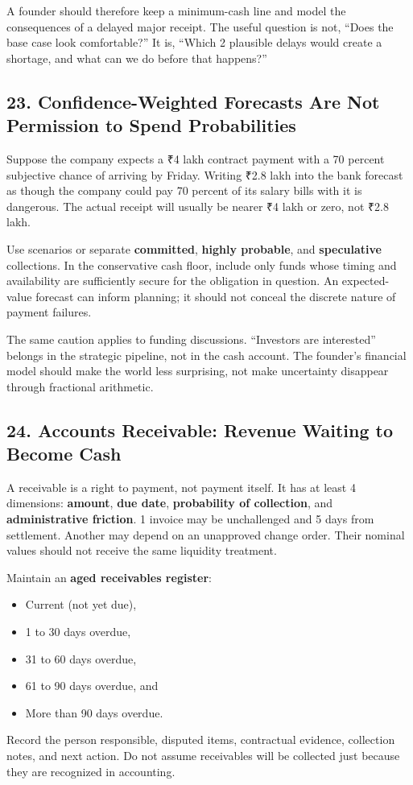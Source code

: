 A founder should therefore keep a minimum-cash line and model the consequences of a delayed major receipt. The useful question is not, ``Does the base case look comfortable?'' It is, ``Which 2 plausible delays would create a shortage, and what can we do before that happens?''

\subsection*{23. Confidence-Weighted Forecasts Are Not Permission to Spend Probabilities}

Suppose the company expects a ₹4 lakh contract payment with a 70 percent subjective chance of arriving by Friday. Writing ₹2.8 lakh into the bank forecast as though the company could pay 70 percent of its salary bills with it is dangerous. The actual receipt will usually be nearer ₹4 lakh or zero, not ₹2.8 lakh.

Use scenarios or separate \textbf{committed}, \textbf{highly probable}, and \textbf{speculative} collections. In the conservative cash floor, include only funds whose timing and availability are sufficiently secure for the obligation in question. An expected-value forecast can inform planning; it should not conceal the discrete nature of payment failures.

The same caution applies to funding discussions. ``Investors are interested'' belongs in the strategic pipeline, not in the cash account. The founder's financial model should make the world less surprising, not make uncertainty disappear through fractional arithmetic.

\subsection*{24. Accounts Receivable: Revenue Waiting to Become Cash}

A receivable is a right to payment, not payment itself. It has at least 4 dimensions: \textbf{amount}, \textbf{due date}, \textbf{probability of collection}, and \textbf{administrative friction}. 1 invoice may be unchallenged and 5 days from settlement. Another may depend on an unapproved change order. Their nominal values should not receive the same liquidity treatment.

Maintain an \textbf{aged receivables register}:
\begin{itemize}
\item Current (not yet due),
\item 1 to 30 days overdue,
\item 31 to 60 days overdue,
\item 61 to 90 days overdue, and
\item More than 90 days overdue.
\end{itemize}
Record the person responsible, disputed items, contractual evidence, collection notes, and next action. Do not assume receivables will be collected just because they are recognized in accounting.

